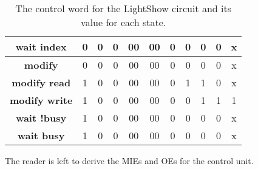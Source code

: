 \begin{table}
{\begin{tabular}{c||c|c|c|c|c|c|c|c|c|c}
            \textbf{ wait index } &    0 &    0 &    0 &    00 &    00 &    0 &    0 &    0 &    0 & x \\ \hline
            \textbf{ modify    } &    0 &    0 &    0 &    00 &    00 &    0 &    0 &    0 &    0 & x \\ \hline
            \textbf{ modify read} &    1 &    0 &    0 &    00 &    00 &    0 &    1 &    1 &    0 & x \\ \hline
            \textbf{ modify write } &    1 &    0 &    0 &    00 &    00 &    0 &    0 &     1 &    1 & 1 \\ \hline
            \textbf{ wait !busy } &    1 &    0 &    0 &    00 &    00 &    0 &    0 &    0 &    0 & x \\ \hline
            \textbf{ wait busy } &    1 &    0 &    0 &    00 &    00 &    0 &    0 &    0 &    0 & x \\
        \end{tabular}
    }
    \caption{The control word for the LightShow circuit and its value for each state.}
    \label{table:LightShow}
\end{table}

The reader is left to derive the MIEs and OEs for the control unit.
